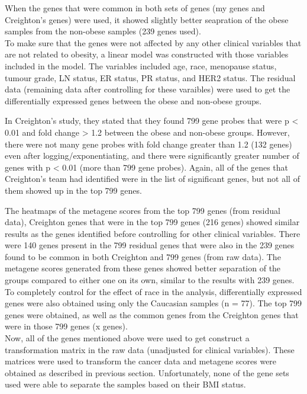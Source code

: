 \documentclass[a4paper, 11pt]{article}
\begin{document}
When the genes that were common in both sets of genes (my genes and Creighton's genes) were used, it showed slightly better seapration of the obese samples from the non-obese samples (239 genes used).\\

To make sure that the genes were not affected by any other clinical variables that are not related to obesity, a linear model was constructed with those variables included in the model.
The variables included age, race, menopause status, tumour grade, LN status, ER status, PR status, and HER2 status.
The residual data (remaining data after controlling for these varaibles) were used to get the differentially expressed genes between the obese and non-obese groups.

In Creighton's study, they stated that they found 799 gene probes that were p \textless{} 0.01 and fold change \textgreater{} 1.2 between the obese and non-obese groups.
However, there were not many gene probes with fold change greater than 1.2 (132 genes) even after logging/exponentiating, and there were significantly greater number of genes with p \textless{} 0.01 (more than 799 gene probes).
Again, all of the genes that Creighton's team had identified were in the list of significant genes, but not all of them showed up in the top 799 genes.

The heatmaps of the metagene scores from the top 799 genes (from residual data), Creighton genes that were in the top 799 genes (216 genes) showed similar results as the genes identified before controlling for other clinical variables.
There were 140 genes present in the 799 residual genes that were also in the 239 genes found to be common in both Creighton and 799 genes (from raw data).
The metagene scores generated from these genes showed better separation of the groups compared to either one on its own, similar to the results with 239 genes.\\

To completely control for the effect of race in the analysis, differentially expressed genes were also obtained using only the Caucasian samples (n = 77).
The top 799 genes were obtained, as well as the common genes from the Creighton genes that were in those 799 genes (x genes).\\

Now, all of the genes mentioned above were used to get construct a transformation matrix in the raw data (unadjusted for clinical variables).
These matrices were used to transform the cancer data and metagene scores were obtained as described in previous section.
Unfortunately, none of the gene sets used were able to separate the samples based on their BMI status.
\end{document}
